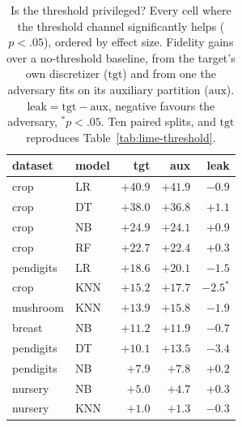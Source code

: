 \documentclass[sigconf,anonymous,review]{acmart}
\begin{document}
\begin{table}[t]
\centering
\caption{Is the threshold privileged? Every cell where the threshold channel significantly helps
($p{<}.05$), ordered by effect size. Fidelity gains over a no-threshold baseline, from the target's
own discretizer ($\text{tgt}$) and from one the adversary fits on its auxiliary partition
($\text{aux}$). $\text{leak}=\text{tgt}-\text{aux}$, negative favours the adversary, $^{*}p{<}.05$.
Ten paired splits, and $\text{tgt}$ reproduces Table~\ref{tab:lime-threshold}.}
\label{tab:auxdisc}
\begin{tabular}{llrrr}
\toprule
dataset & model & tgt & aux & leak \\
\midrule
crop      & LR  & $+40.9$ & $+41.9$ & $-0.9$ \\
crop      & DT  & $+38.0$ & $+36.8$ & $+1.1$ \\
crop      & NB  & $+24.9$ & $+24.1$ & $+0.9$ \\
crop      & RF  & $+22.7$ & $+22.4$ & $+0.3$ \\
pendigits & LR  & $+18.6$ & $+20.1$ & $-1.5$ \\
crop      & KNN & $+15.2$ & $+17.7$ & $-2.5^{*}$ \\
mushroom  & KNN & $+13.9$ & $+15.8$ & $-1.9$ \\
breast    & NB  & $+11.2$ & $+11.9$ & $-0.7$ \\
pendigits & DT  & $+10.1$ & $+13.5$ & $-3.4$ \\
pendigits & NB  & $+7.9$  & $+7.8$  & $+0.2$ \\
nursery   & NB  & $+5.0$  & $+4.7$  & $+0.3$ \\
nursery   & KNN & $+1.0$  & $+1.3$  & $-0.3$ \\
\bottomrule
\end{tabular}
\end{table}
\end{document}

